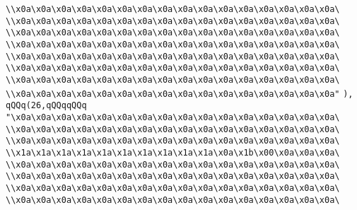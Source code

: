 \verb|\\x0a\x0a\x0a\x0a\x0a\x0a\x0a\x0a\x0a\x0a\x0a\x0a\x0a\x0a\x0a\x0a\|\newline
\verb|\\x0a\x0a\x0a\x0a\x0a\x0a\x0a\x0a\x0a\x0a\x0a\x0a\x0a\x0a\x0a\x0a\|\newline
\verb|\\x0a\x0a\x0a\x0a\x0a\x0a\x0a\x0a\x0a\x0a\x0a\x0a\x0a\x0a\x0a\x0a\|\newline
\verb|\\x0a\x0a\x0a\x0a\x0a\x0a\x0a\x0a\x0a\x0a\x0a\x0a\x0a\x0a\x0a\x0a\|\newline
\verb|\\x0a\x0a\x0a\x0a\x0a\x0a\x0a\x0a\x0a\x0a\x0a\x0a\x0a\x0a\x0a\x0a\|\newline
\verb|\\x0a\x0a\x0a\x0a\x0a\x0a\x0a\x0a\x0a\x0a\x0a\x0a\x0a\x0a\x0a\x0a\|\newline
\verb|\\x0a\x0a\x0a\x0a\x0a\x0a\x0a\x0a\x0a\x0a\x0a\x0a\x0a\x0a\x0a\x0a\|\newline
\verb|\\x0a\x0a\x0a\x0a\x0a\x0a\x0a\x0a\x0a\x0a\x0a\x0a\x0a\x0a\x0a\x0a"|\newline
\verb|),|\newline
\verb|qQQq(26,qQQqqQQq|\newline
\verb|"\x0a\x0a\x0a\x0a\x0a\x0a\x0a\x0a\x0a\x0a\x0a\x0a\x0a\x0a\x0a\x0a\|\newline
\verb|\\x0a\x0a\x0a\x0a\x0a\x0a\x0a\x0a\x0a\x0a\x0a\x0a\x0a\x0a\x0a\x0a\|\newline
\verb|\\x0a\x0a\x0a\x0a\x0a\x0a\x0a\x0a\x0a\x0a\x0a\x0a\x0a\x0a\x0a\x0a\|\newline
\verb|\\x1a\x1a\x1a\x1a\x1a\x1a\x1a\x1a\x1a\x1a\x0a\x1b\x00\x0a\x0a\x0a\|\newline
\verb|\\x0a\x0a\x0a\x0a\x0a\x0a\x0a\x0a\x0a\x0a\x0a\x0a\x0a\x0a\x0a\x0a\|\newline
\verb|\\x0a\x0a\x0a\x0a\x0a\x0a\x0a\x0a\x0a\x0a\x0a\x0a\x0a\x0a\x0a\x0a\|\newline
\verb|\\x0a\x0a\x0a\x0a\x0a\x0a\x0a\x0a\x0a\x0a\x0a\x0a\x0a\x0a\x0a\x0a\|\newline
\verb|\\x0a\x0a\x0a\x0a\x0a\x0a\x0a\x0a\x0a\x0a\x0a\x0a\x0a\x0a\x0a\x0a\|\newline
